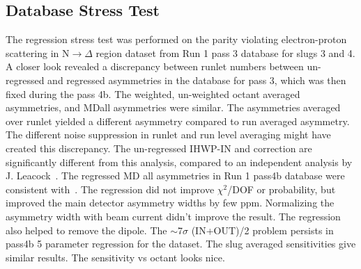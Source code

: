 \subsection{Database Stress Test}
\label{Database Stress Test}

%

The regression stress test was performed on the parity violating electron-proton scattering in N$\rightarrow\Delta$ region dataset from Run 1 pass 3 database for slugs 3 and 4. A closer look revealed a discrepancy between runlet numbers between un-regressed and regressed asymmetries in the database for pass 3, which was then fixed during the pass 4b. 
The weighted, un-weighted octant averaged asymmetries, and MDall asymmetries were similar. The asymmetries averaged over runlet yielded a different asymmetry compared to run averaged asymmetry. The different noise suppression in runlet and run level averaging might have created this discrepancy. 
The un-regressed IHWP-IN and correction are significantly different from this analysis, compared to an independent analysis by J. Leacock~\cite{leacock_qweak}.
The regressed MD all asymmetries in Run 1 pass4b database were consistent with~\cite{leacock_qweak}.
The regression did not improve $\chi^{2}$/DOF or probability, but improved the main detector asymmetry widths by few ppm.
Normalizing the asymmetry width with beam current didn't improve the result.
The regression also helped to remove the dipole.
The $\sim$7$\sigma$ (IN+OUT)/2 problem persists in pass4b 5 parameter regression for the dataset.
The slug averaged sensitivities give similar results.
The sensitivity vs octant looks nice.


